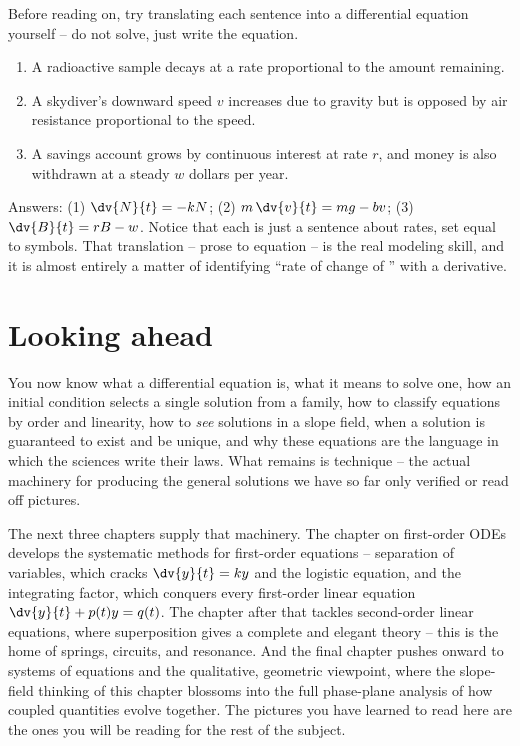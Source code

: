 \begin{labbox}
Before reading on, try translating each sentence into a differential equation yourself -- do not solve, just write the equation.
\begin{enumerate}
  \item A radioactive sample decays at a rate proportional to the amount remaining.
  \item A skydiver's downward speed $v$ increases due to gravity but is opposed by air resistance proportional to the speed.
  \item A savings account grows by continuous interest at rate $r$, and money is also withdrawn at a steady $w$ dollars per year.
\end{enumerate}
Answers: (1) $\dv{N}{t} = -kN$; (2) $m\,\dv{v}{t} = mg - bv$; (3) $\dv{B}{t} = rB - w$. Notice that each is just a sentence about rates, set equal to symbols. That translation -- prose to equation -- is the real modeling skill, and it is almost entirely a matter of identifying ``rate of change of \underline{\hspace{1.5em}}'' with a derivative.
\end{labbox}

\section{Looking ahead}
\label{ch36:sec-ahead}

You now know what a differential equation is, what it means to solve one, how an initial condition selects a single solution from a family, how to classify equations by order and linearity, how to \emph{see} solutions in a slope field, when a solution is guaranteed to exist and be unique, and why these equations are the language in which the sciences write their laws. What remains is technique -- the actual machinery for producing the general solutions we have so far only verified or read off pictures.

The next three chapters supply that machinery. The chapter on first-order ODEs develops the systematic methods for first-order equations -- separation of variables, which cracks $\dv{y}{t}=ky$ and the logistic equation, and the integrating factor, which conquers every first-order linear equation $\dv{y}{t}+p(t)y=q(t)$. The chapter after that tackles second-order linear equations, where superposition gives a complete and elegant theory -- this is the home of springs, circuits, and resonance. And the final chapter pushes onward to systems of equations and the qualitative, geometric viewpoint, where the slope-field thinking of this chapter blossoms into the full phase-plane analysis of how coupled quantities evolve together. The pictures you have learned to read here are the ones you will be reading for the rest of the subject.

